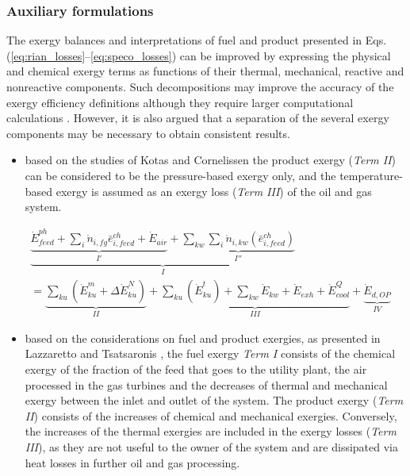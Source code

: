\documentclass[times,3p]{elsarticle}
\begin{document}
\subsubsection{Auxiliary formulations}

The exergy balances and interpretations of fuel and product presented in Eqs.(\ref{eq:rian_losses}--\ref{eq:speco_losses}) can be improved by expressing the physical and chemical exergy terms as functions of their thermal, mechanical, reactive and nonreactive components. Such decompositions may improve the accuracy of the exergy efficiency definitions although they require larger computational calculations \cite{Lazzaretto1999,Lazzaretto2006}. However, it is also argued that a separation of the several exergy components may be necessary to obtain consistent results.    

\begin{itemize}
	\item based on the studies of Kotas \cite{Kotas1995} and Cornelissen \cite{Cornelissen1997} the product exergy (\emph{Term II}) can be considered to be the pressure-based exergy only, and the temperature-based exergy is assumed as an exergy loss (\emph{Term III}) of the oil and gas system. 
\end{itemize} 

\begin{align}
		&\underbrace{\underbrace{\dot{E}^{ph}_{feed}+\sum_i \dot{n}_{i,fg}\bar{e}^{ch}_{i,feed}+\dot{E}_{air}}_{I'}+\underbrace{\sum_{kw}\sum_i \dot{n}_{i,kw}(\bar{e}^{ch}_{i,feed})}_{I''}}_{I} \nonumber\\
		&=\underbrace{\sum_{ku}\left(\dot{E}^{m}_{ku}+\Delta{\dot{E}}^{N}_{ku}\right)}_{II}+\underbrace{\sum_{ku}\left(\dot{E}^{t}_{ku}\right)+\sum_{kw} \dot{E}_{kw}+\dot{E}_{exh}+\dot{E}^Q_{cool}}_{III}+\underbrace{\dot{E}_{d,OP}}_{IV}
\label{eq:rian_pressure}
\end{align}
 
\begin{itemize}
	\item based on the considerations on fuel and product exergies, as presented in Lazzaretto and Tsatsaronis \cite{Lazzaretto1999,Lazzaretto2006}, the fuel exergy \emph{Term I} consists of the chemical exergy of the fraction of the feed that goes to the utility plant, the air processed in the gas turbines and the decreases of thermal and mechanical exergy between the inlet and outlet of the system. The product exergy (\emph{Term II}) consists of the increases of chemical and mechanical exergies. Conversely, the increases of the thermal exergies are included in the exergy losses (\emph{Term III}), as they are not useful to the owner of the system and are dissipated via heat losses in further oil and gas processing.
\end{itemize}
\end{document}
